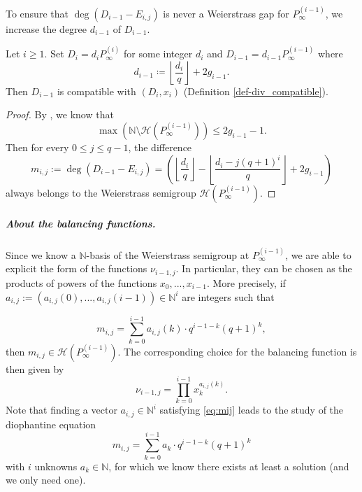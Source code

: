 \documentclass[a4paper,USenglish,autoref]{lipics-v2021}
\newcommand\N{\mathbb{N}}
\newcommand\floor[1]{\left\lfloor #1 \right\rfloor}
\newcommand\calH{\mathcal{H}}
\newcommand\mydef{\coloneqq}
\newcommand{\cd}{\cdot}
\begin{document}
To ensure that 
$\deg(D_{i-1}-E_{i,j})$ is never a Weierstrass gap for $P_{\infty}^{(i-1)}$, we increase the degree $d_{i-1}$ of $D_{i-1}$. 

\begin{theorem}\label{th:div-comp-HT}
	Let $i \geq 1$. Set $D_i = d_i P^{(i)}_{\infty}$ for some integer $d_i$ and $D_{i-1} = d_{i-1} P^{(i-1)}_{\infty}$ where
	\begin{equation}\label{eq:deg_herm}
		d_{i-1} \mydef \floor{ \dfrac{d_i}{q}} + 2g_{i-1}.
	\end{equation}
	Then $D_{i-1}$ is compatible with $(D_i,x_i)$  (Definition \ref{def-div_compatible}).
\end{theorem}

\begin{proof}
	By \cite[Theorem 1.6.8]{S08}, we know that
	\[\max\left(\N \setminus \calH\left(P^{(i-1)}_{\infty}\right)\right) \leq 2g_{i-1} -1.\]
	Then for every $0 \leq j \leq q-1$, the difference
	\begin{equation}
		m_{i,j}:=\deg(D_{i-1}-E_{i,j}) =  \left(\left\lfloor \dfrac{d_i}{q} \right\rfloor - \left\lfloor \dfrac{d_i-j(q+1)^i}{q}\right\rfloor + 2g_{i-1} \right)
	\end{equation}
	always belongs to the Weierstrass semigroup $\mathcal{H}\left(P_{\infty}^{(i-1)}\right)$.
\end{proof}

\subparagraph*{About the balancing functions.}

Since we know a $\mathbb{N}$-basis of the Weierstrass semigroup at $P_{\infty}^{(i-1)}$, we are able to explicit the form of the functions $\nu_{i-1,j}$. In particular, they can be chosen as the products of powers of the functions $x_0,...,x_{i-1}$. More precisely, if $a_{i,j} := (a_{i,j}(0),...,a_{i,j}(i-1)) \in \mathbb{N}^i$ are integers such that

\begin{equation}\label{eq:mij}
	m_{i,j} = \sum\limits_{k=0}^{i-1} a_{i,j}(k) \cd q^{i-1-k}(q+1)^k,
\end{equation}
then $m_{i,j} \in \mathcal{H}\left(P_{\infty}^{(i-1)}\right)$. The corresponding choice for the balancing function is then given by 
\[ \nu_{i-1,j} = \prod\limits_{k=0}^{i-1} x_k^{a_{i,j}(k)}.\]
Note that finding a vector $a_{i,j} \in \mathbb{N}^i$ satisfying \eqref{eq:mij} leads to the study of the diophantine equation
\[m_{i,j} = \sum\limits_{k=0}^{i-1} a_k \cd q^{i-1-k}(q+1)^k\]
with $i$ unknowns $a_k \in \mathbb{N}$, for which we know there exists at least a solution (and we only need one).
\end{document}
